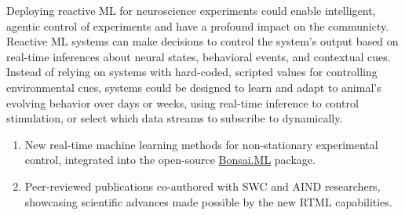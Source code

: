Deploying reactive ML for neuroscience experiments could enable intelligent, agentic control of experiments and have a profound impact on the communicty. Reactive ML systems can make decisions to control the system's output based on real-time inferences about neural states, behavioral events, and contextual cues. Instead of relying on systems with hard-coded, scripted values for controlling environmental cues, systems could be designed to learn and adapt to animal’s evolving behavior over days or weeks, using real-time inference to control stimulation, or select which data streams to subscribe to dynamically.


\begin{enumerate}
    \item New real-time machine learning methods for non-stationary experimental control, integrated into the open-source \href{https://bonsai-rx.org/machinelearning/}{Bonsai.ML} package.
    \item Peer-reviewed publications co-authored with SWC and AIND researchers, showcasing scientific advances made possible by the new RTML capabilities.
\end{enumerate}


